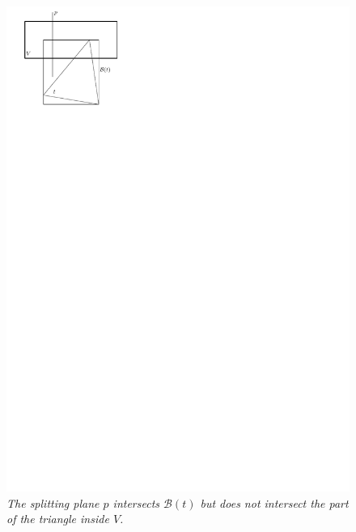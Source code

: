 \documentclass[12pt]{article}
\begin{document}
\begin{figure}
\centering
\includegraphics{figs/splitClipping2}
\caption{\textit{The splitting plane $p$ intersects $\mathcal{B}(t)$ but does not intersect the part of the triangle inside $V$.}}
\label{figure:sc2}
\end{figure}
\end{document}
